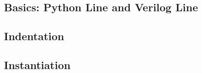 \subsection{Basics: Python Line and Verilog Line}

\subsection{Indentation}

\subsection{Instantiation}
